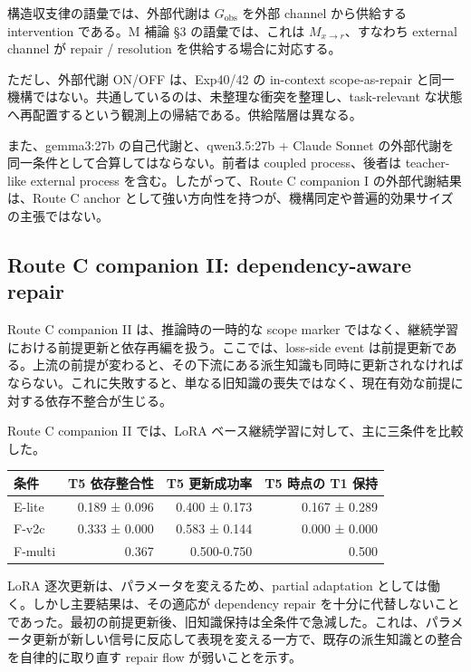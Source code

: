 \documentclass[12pt,a4paper]{article}
\begin{document}
構造収支律の語彙では、外部代謝は \(G_{\mathrm{obs}}\) を外部 channel から供給する intervention である。M 補論 §3 の語彙では、これは \(M_{x\to r}\)、すなわち external channel が repair / resolution を供給する場合に対応する。

ただし、外部代謝 ON/OFF は、Exp40/42 の in-context scope-as-repair と同一機構ではない。共通しているのは、未整理な衝突を整理し、task-relevant な状態へ再配置するという観測上の帰結である。供給階層は異なる。

また、gemma3:27b の自己代謝と、qwen3.5:27b + Claude Sonnet の外部代謝を同一条件として合算してはならない。前者は coupled process、後者は teacher-like external process を含む。したがって、Route C companion I の外部代謝結果は、Route C anchor として強い方向性を持つが、機構同定や普遍的効果サイズの主張ではない。

\subsection{Route C companion II: dependency-aware repair}\label{route-c-companion-ii-dependency-aware-repair}

Route C companion II は、推論時の一時的な scope marker ではなく、継続学習における前提更新と依存再編を扱う。ここでは、loss-side event は前提更新である。上流の前提が変わると、その下流にある派生知識も同時に更新されなければならない。これに失敗すると、単なる旧知識の喪失ではなく、現在有効な前提に対する依存不整合が生じる。

Route C companion II では、LoRA ベース継続学習に対して、主に三条件を比較した。

{\def\LTcaptype{table} %
\begin{longtable}[]{@{}lrrr@{}}
\toprule\noalign{}
条件 & T5 依存整合性 & T5 更新成功率 & T5 時点の T1 保持 \\
\midrule\noalign{}
\endhead
\bottomrule\noalign{}
\endlastfoot
E-lite & 0.189 ± 0.096 & 0.400 ± 0.173 & 0.167 ± 0.289 \\
F-v2c & 0.333 ± 0.000 & 0.583 ± 0.144 & 0.000 ± 0.000 \\
F-multi & 0.367 & 0.500-0.750 & 0.500 \\
\end{longtable}
}

LoRA 逐次更新は、パラメータを変えるため、partial adaptation としては働く。しかし主要結果は、その適応が dependency repair を十分に代替しないことであった。最初の前提更新後、旧知識保持は全条件で急減した。これは、パラメータ更新が新しい信号に反応して表現を変える一方で、既存の派生知識との整合を自律的に取り直す repair flow が弱いことを示す。
\end{document}
